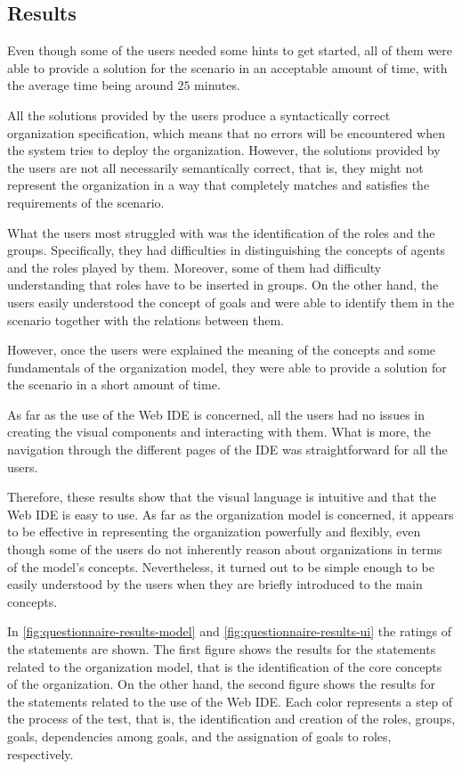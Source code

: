 \subsection{Results}
Even though some of the users needed some hints to get started, all of them were able to provide a solution for the scenario in an acceptable amount of time, with the average time being around $25$ minutes.

All the solutions provided by the users produce a syntactically correct organization specification, which means that no errors will be encountered when the system tries to deploy the organization.
However, the solutions provided by the users are not all necessarily semantically correct, that is, they might not represent the organization in a way that completely matches and satisfies the requirements of the scenario.

What the users most struggled with was the identification of the roles and the groups.
Specifically, they had difficulties in distinguishing the concepts of agents and the roles played by them.
Moreover, some of them had difficulty understanding that roles have to be inserted in groups.
On the other hand, the users easily understood the concept of goals and were able to identify them in the scenario together with the relations between them.

However, once the users were explained the meaning of the concepts and some fundamentals of the organization model, they were able to provide a solution for the scenario in a short amount of time.

As far as the use of the Web IDE is concerned, all the users had no issues in creating the visual components and interacting with them.
What is more, the navigation through the different pages of the IDE was straightforward for all the users.

Therefore, these results show that the visual language is intuitive and that the Web IDE is easy to use.
As far as the organization model is concerned, it appears to be effective in representing the organization powerfully and flexibly, even though some of the users do not inherently reason about organizations in terms of the model's concepts.
Nevertheless, it turned out to be simple enough to be easily understood by the users when they are briefly introduced to the main concepts.

In \cref{fig:questionnaire-results-model} and \cref{fig:questionnaire-results-ui} the ratings of the statements are shown.
The first figure shows the results for the statements related to the organization model, that is the identification of the core concepts of the organization.
On the other hand, the second figure shows the results for the statements related to the use of the Web IDE.
Each color represents a step of the process of the test, that is, the identification and creation of the roles, groups, goals, dependencies among goals, and the assignation of goals to roles, respectively.

